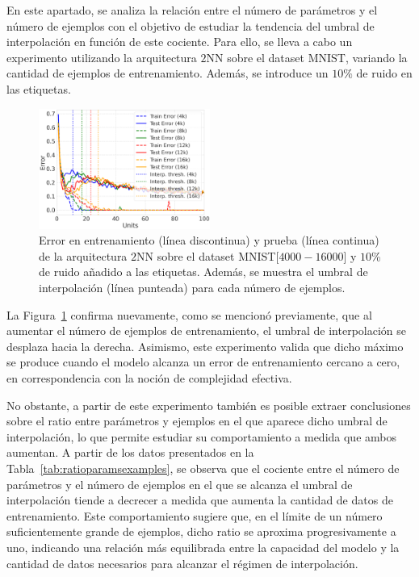 En este apartado, se analiza la relación entre el número de parámetros y el número de ejemplos con el objetivo de estudiar la tendencia del umbral de interpolación en función de este cociente. Para ello, se lleva a cabo un experimento utilizando la arquitectura $2$NN sobre el dataset MNIST, variando la cantidad de ejemplos de entrenamiento. Además, se introduce un $10\%$ de ruido en las etiquetas.

\begin{figure}[h]
    \centering
    \includegraphics[width=0.5\textwidth]{img/experiments/ratioparamsexamples.png}
    \caption[Ratio parámetros frente a número de ejemplos en el doble descenso.]{Error en entrenamiento (línea discontinua) y prueba (línea continua) de la arquitectura $2$NN sobre el dataset MNIST[$4000-16000$] y $10$\% de ruido añadido a las etiquetas. Además, se muestra el umbral de interpolación (línea punteada) para cada número de ejemplos.}\label{fig:ratioparamsexamples}
\end{figure}

La Figura~\ref{fig:ratioparamsexamples} confirma nuevamente, como se mencionó previamente, que al aumentar el número de ejemplos de entrenamiento, el umbral de interpolación se desplaza hacia la derecha. Asimismo, este experimento valida que dicho máximo se produce cuando el modelo alcanza un error de entrenamiento cercano a cero, en correspondencia con la noción de complejidad efectiva.

No obstante, a partir de este experimento también es posible extraer conclusiones sobre el ratio entre parámetros y ejemplos en el que aparece dicho umbral de interpolación, lo que permite estudiar su comportamiento a medida que ambos aumentan. A partir de los datos presentados en la Tabla~\ref{tab:ratioparamsexamples}, se observa que el cociente entre el número de parámetros y el número de ejemplos en el que se alcanza el umbral de interpolación tiende a decrecer a medida que aumenta la cantidad de datos de entrenamiento. Este comportamiento sugiere que, en el límite de un número suficientemente grande de ejemplos, dicho ratio se aproxima progresivamente a uno, indicando una relación más equilibrada entre la capacidad del modelo y la cantidad de datos necesarios para alcanzar el régimen de interpolación. 

